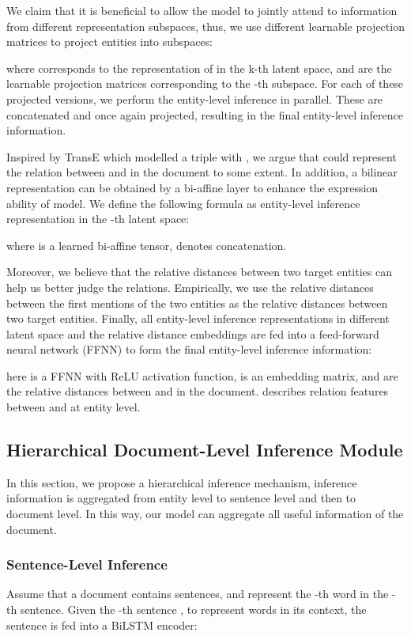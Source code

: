 \documentclass[runningheads]{llncs}
\begin{document}
We claim that it is beneficial to allow the model to jointly attend to information from different representation subspaces, thus, we use different learnable projection matrices to project entities into   subspaces:

where  corresponds to the representation of  in the k-th latent space, 
 and  are the learnable projection matrices corresponding to the -th subspace.
For each of these projected versions, we perform the entity-level inference in parallel.
These are concatenated and once again projected, resulting in the final entity-level inference information.

Inspired by TransE \cite{bordes2013translating} which modelled a triple  with , we argue that  could represent the relation between  and  in the document to some extent.
In addition, a bilinear representation can be obtained by a bi-affine layer to enhance the expression ability of model.
We define the following formula as entity-level inference representation in the -th latent space:

where  is a learned bi-affine tensor,  denotes concatenation.

Moreover, we believe that the relative distances between two target entities can help us better judge the relations. 
Empirically, we use the relative distances between the first mentions of the two entities as the relative distances between two target entities. Finally, all entity-level inference representations in different latent space and the relative distance embeddings are fed into a feed-forward neural network (FFNN) to form the final entity-level inference information:

here  is a FFNN with ReLU activation function,  is an embedding matrix,  and  are the relative distances between  and  in the document.
 describes relation features between  and  at entity level. 

\subsection{Hierarchical Document-Level Inference Module}
In this section, we propose a hierarchical inference mechanism, inference information is aggregated from entity level to sentence level and then to document level.
In this way, our model can aggregate all useful information of the document.

\subsubsection{Sentence-Level Inference}
Assume that a document contains  sentences, and
 represent the -th word in the -th sentence.
Given the -th sentence , to represent words in its context, the sentence is fed into a BiLSTM encoder:
\end{document}
